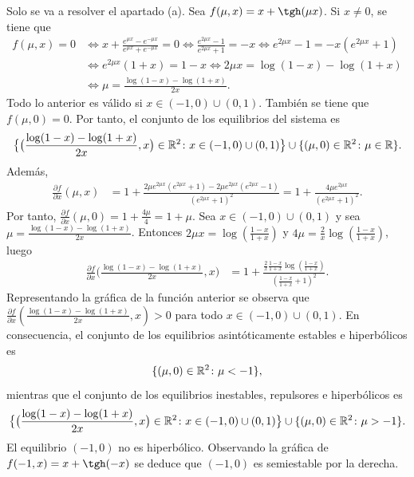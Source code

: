\documentclass[11pt]{report}
\begin{document}
\begin{solution}
    Solo se va a resolver el apartado (a). Sea $f(\mu,x) = x+\tgh(\mu x)$. Si $x \neq 0$, se tiene que
    \begin{align*}
        f(\mu,x) = 0 &\iff x + \frac{e^{\mu x} - e^{-\mu x}}{e^{\mu x} + e^{-\mu x}} = 0 \iff  \frac{e^{2\mu x} - 1}{e^{2\mu x} + 1}= -x \iff e^{2\mu x} - 1 = -x(e^{2\mu x} + 1) \\
        &\iff e^{2\mu x}(1+x) = 1-x \iff 2\mu x = \log(1-x)-\log(1+x) \\
        &\iff \mu = \frac{ \log(1-x)-\log(1+x)}{2x}.
    \end{align*}
    Todo lo anterior es válido si $x \in (-1,0) \cup (0,1)$. También se tiene que $f(\mu,0) = 0$. Por tanto, el conjunto de los equilibrios del sistema es
    \[\bigl\{\bigl(\frac{ \log(1-x)-\log(1+x)}{2x},x\bigr)\in\mathbb R^2\colon x \in (-1,0)\cup (0,1)\bigr\} \cup \{(\mu,0) \in\mathbb R^2\colon \mu \in \mathbb R\}.\]
    Además, \begin{align*}
        \frac{\partial f}{\partial x}(\mu,x) &= 1+\frac{2\mu e^{2\mu x}(e^{2\mu x} +1) -2\mu e^{2\mu x} (e^{2\mu x}-1)}{(e^{2\mu x}+1)^2} = 1+\frac{4\mu e^{2\mu x}}{(e^{2\mu x}+1)^2}.
    \end{align*}
    Por tanto, $\frac{\partial f}{\partial x}(\mu,0) = 1+\frac{4\mu}{4} = 1+\mu$. Sea $x \in (-1,0)\cup(0,1)$ y sea $\mu = \frac{ \log(1-x)-\log(1+x)}{2x}$. Entonces $2\mu x = \log(\frac{1-x}{1+x})$ y $4\mu = \frac{2}{x}\log(\frac{1-x}{1+x})$, luego 
    \begin{align*}
        \frac{\partial f}{\partial x}\bigl(\frac{ \log(1-x)-\log(1+x)}{2x},x\bigr) &= 1+\frac{\frac{2}{x}\frac{1-x}{1+x}\log(\frac{1-x}{1+x})}{(\frac{1-x}{1+x}+1)^2}.
    \end{align*}
    Representando la gráfica de la función anterior se observa que $\frac{\partial f}{\partial x}(\frac{ \log(1-x)-\log(1+x)}{2x},x) > 0$ para todo $x \in (-1,0)\cup (0,1)$. En consecuencia, el conjunto de los equilibrios asintóticamente estables e hiperbólicos es
    \[\{(\mu,0)\in \mathbb R^2 \colon \mu < -1\},\]
    mientras que el conjunto de los equilibrios inestables, repulsores e hiperbólicos es
    \[\bigl\{\bigl(\frac{ \log(1-x)-\log(1+x)}{2x},x\bigr)\in\mathbb R^2\colon x \in (-1,0)\cup (0,1)\bigr\} \cup \{(\mu,0)\in \mathbb R^2 \colon \mu > -1\}.\]
    El equilibrio $(-1,0)$ no es hiperbólico. Observando la gráfica de $f(-1,x) = x+\tgh(-x)$ se deduce que $(-1,0)$ es semiestable por la derecha.
    \begin{figure}[H]
        \centering

\end{figure}
\end{solution}
\end{document}
